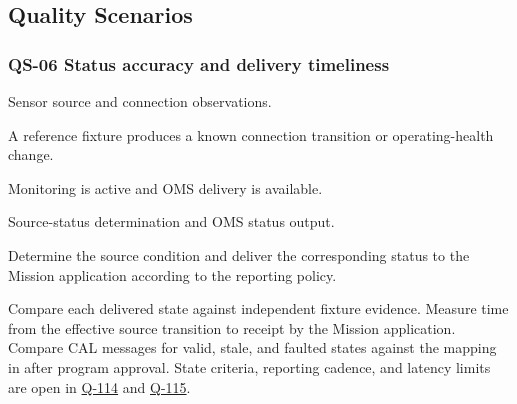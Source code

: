 \subsection{Quality Scenarios}

\subsubsection{QS-06 Status accuracy and delivery timeliness}
\label{Scenario:QS-06}
\begin{description}[leftmargin=0pt,labelindent=0pt,labelsep=0pt,style=nextline]
\item[Stimulus source] Sensor source and connection observations.
\item[Stimulus] A reference fixture produces a known connection transition or operating-health change.
\item[Environment] Monitoring is active and OMS delivery is available.
\item[Artifact] Source-status determination and OMS status output.
\item[Response] Determine the source condition and deliver the corresponding status to the Mission application according to the reporting policy.
\item[Response measure] Compare each delivered state against independent fixture evidence. Measure time from the effective source transition to receipt by the Mission application. Compare CAL messages for valid, stale, and faulted states against the mapping in  after program approval. State criteria, reporting cadence, and latency limits are open in \hyperref[Question:Q-114]{Q-114} and \hyperref[Question:Q-115]{Q-115}.
\end{description}

